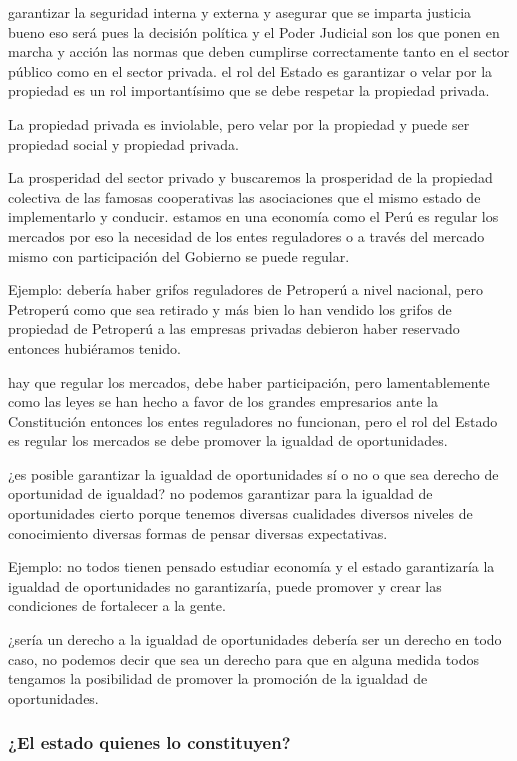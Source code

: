 \documentclass[
  jou,
  floatsintext,
  longtable,
  a4paper,
  nolmodern,
  notxfonts,
  notimes,
  12pt,
  colorlinks=true,linkcolor=blue,citecolor=blue,urlcolor=blue]{apa7}
\begin{document}
garantizar la seguridad interna y externa y asegurar que se imparta
justicia bueno eso será pues la decisión política y el Poder Judicial
son los que ponen en marcha y acción las normas que deben cumplirse
correctamente tanto en el sector público como en el sector privada. el
rol del Estado es garantizar o velar por la propiedad es un rol
importantísimo que se debe respetar la propiedad privada.

La propiedad privada es inviolable, pero velar por la propiedad y puede
ser propiedad social y propiedad privada.

La prosperidad del sector privado y buscaremos la prosperidad de la
propiedad colectiva de las famosas cooperativas las asociaciones que el
mismo estado de implementarlo y conducir. estamos en una economía como
el Perú es regular los mercados por eso la necesidad de los entes
reguladores o a través del mercado mismo con participación del Gobierno
se puede regular.

Ejemplo: debería haber grifos reguladores de Petroperú a nivel nacional,
pero Petroperú como que sea retirado y más bien lo han vendido los
grifos de propiedad de Petroperú a las empresas privadas debieron haber
reservado entonces hubiéramos tenido.

hay que regular los mercados, debe haber participación, pero
lamentablemente como las leyes se han hecho a favor de los grandes
empresarios ante la Constitución entonces los entes reguladores no
funcionan, pero el rol del Estado es regular los mercados se debe
promover la igualdad de oportunidades.

¿es posible garantizar la igualdad de oportunidades sí o no o que sea
derecho de oportunidad de igualdad? no podemos garantizar para la
igualdad de oportunidades cierto porque tenemos diversas cualidades
diversos niveles de conocimiento diversas formas de pensar diversas
expectativas.

Ejemplo: no todos tienen pensado estudiar economía y el estado
garantizaría la igualdad de oportunidades no garantizaría, puede
promover y crear las condiciones de fortalecer a la gente.

¿sería un derecho a la igualdad de oportunidades debería ser un derecho
en todo caso, no podemos decir que sea un derecho para que en alguna
medida todos tengamos la posibilidad de promover la promoción de la
igualdad de oportunidades.

\subsubsection{¿El estado quienes lo
constituyen?}\label{el-estado-quienes-lo-constituyen}
\end{document}
